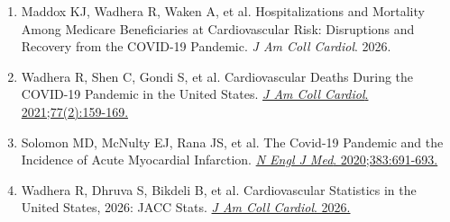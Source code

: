 \documentclass[12pt,a4paper]{article}
\begin{document}
\begin{enumerate}
    \item Maddox KJ, Wadhera R, Waken A, et al. Hospitalizations and Mortality Among Medicare Beneficiaries at Cardiovascular Risk: Disruptions and Recovery from the COVID-19 Pandemic. \textit{J Am Coll Cardiol}. 2026.

    \item Wadhera R, Shen C, Gondi S, et al. Cardiovascular Deaths During the COVID-19 Pandemic in the United States. \href{https://doi.org/10.1016/j.jacc.2020.10.055}{\textit{J Am Coll Cardiol}. 2021;77(2):159-169.}

    \item Solomon MD, McNulty EJ, Rana JS, et al. The Covid-19 Pandemic and the Incidence of Acute Myocardial Infarction. \href{https://doi.org/10.1056/NEJMc2015630}{\textit{N Engl J Med}. 2020;383:691-693.}

    \item Wadhera R, Dhruva S, Bikdeli B, et al. Cardiovascular Statistics in the United States, 2026: JACC Stats. \href{https://doi.org/10.1016/j.jacc.2025.12.027}{\textit{J Am Coll Cardiol}. 2026.}
\end{enumerate}
\end{document}

